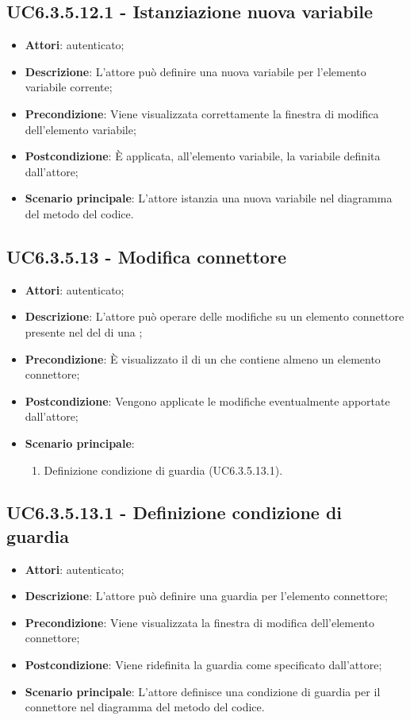 \subsection{UC6.3.5.12.1 - Istanziazione nuova variabile}
\label{ssec:UC6.3.5.12.1}
\begin{itemize}
\item \textbf{Attori}:  autenticato;
\item \textbf{Descrizione}: L'attore può definire una nuova variabile per l'elemento variabile corrente;
\item \textbf{Precondizione}: Viene visualizzata correttamente la finestra di modifica dell'elemento variabile;
\item \textbf{Postcondizione}: È applicata, all'elemento variabile, la variabile definita dall'attore;
\item \textbf{Scenario principale}: L'attore istanzia una nuova variabile nel diagramma del metodo del codice.
\end{itemize}
\subsection{UC6.3.5.13 - Modifica connettore}
\label{ssec:UC6.3.5.13}
\begin{itemize}
\item \textbf{Attori}:  autenticato;
\item \textbf{Descrizione}: L'attore può operare delle modifiche su un elemento connettore presente nel  del  di una ;
\item \textbf{Precondizione}: È visualizzato il  di un  che contiene almeno un elemento connettore;
\item \textbf{Postcondizione}: Vengono applicate le modifiche eventualmente apportate dall'attore;
\item \textbf{Scenario principale}: \begin{enumerate}\item Definizione condizione di guardia (UC6.3.5.13.1).
 \end{enumerate}
\end{itemize}
\subsection{UC6.3.5.13.1 - Definizione condizione di guardia}
\label{ssec:UC6.3.5.13.1}
\begin{itemize}
\item \textbf{Attori}:  autenticato;
\item \textbf{Descrizione}: L'attore può definire una guardia per l'elemento connettore;
\item \textbf{Precondizione}: Viene visualizzata la finestra di modifica dell'elemento connettore;
\item \textbf{Postcondizione}: Viene ridefinita la guardia come specificato dall'attore;
\item \textbf{Scenario principale}: L'attore definisce una condizione di guardia per il connettore nel diagramma del metodo del codice.
\end{itemize}
